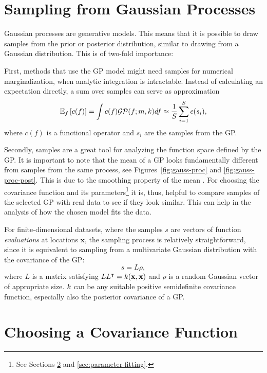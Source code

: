 \section{Sampling from Gaussian Processes}

Gaussian processes are generative models. This means that it is possible to
draw samples from the prior or posterior distribution, similar to drawing
from a Gaussian distribution. This is of two-fold importance:

First, methods that use the GP model might need samples for numerical
marginalization, when analytic integration is intractable. Instead of
calculating an expectation directly, a sum over samples can serve as
approximation
\begin{equation}
  \mathbb{E}_{f}\left[c(f)\right]= \int c(f) \mathcal{GP}(f;m,k) df \approx \frac{1}{S}
\sum_{i=1}^S c(s_i),
\end{equation}
where $c(f)$ is a functional operator and $s_i$ are the samples from the GP.

Secondly, samples are a great tool for analyzing the function space defined by
the GP. It is important to note that the mean of a GP looks fundamentally
different from samples from the same process, see Figures~\ref{fig:gauss-proc}
and \ref{fig:gauss-proc-post}. This is due to the smoothing property of the
mean \cite[\ts~2.6]{Rasmussen.Williams:2006:Gaussian}. For choosing the
covariance function and its parameters\footnote[][3mm]{See Sections
\ref{sec:covariance-functions} and \ref{sec:parameter-fitting}.} it is, thus,
helpful to compare samples of the selected GP with real data to see if they
look similar. This can help in the analysis of how the chosen model fits the
data.

For finite-dimensional datasets, where the samples $s$ are vectors of function
\emph{evaluations} at locations $\mathbf{x}$, the sampling process is relatively
straightforward, since it is equivalent to sampling from a multivariate Gaussian
distribution with the covariance of the GP:
\begin{equation}
  s = L \rho,
\end{equation}
where $L$ is a matrix satisfying $LL^{\intercal} = k(\mathbf{x},\mathbf{x})$ and $\rho$
is a random Gaussian vector of appropriate size. $k$ can be any suitable
positive semidefinite covariance function, especially also the posterior
covariance of a GP.

\section{Choosing a Covariance Function}
\label{sec:covariance-functions}

